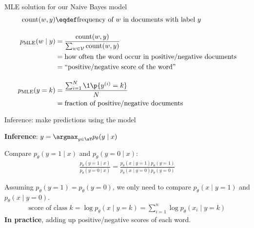 \documentclass[usenames,dvipsnames,notes,11pt,aspectratio=169]{beamer}
\newcommand{\pdfnote}[1]{}
\begin{document}

\begin{frame}
    {MLE solution for our Naive Bayes model}
    \begin{align*}
        \text{count}(w, y) &\eqdef \text{frequency of $w$ in documents with label $y$}\\[1em]
        p_{\text{MLE}}(w\mid y) &= \frac{\text{count}(w, y)}{\sum_{w\in\mathcal{V}}\text{count}(w, y)}\\
        &= \text{how often the word occur in positive/negative documents}\\
        &= \text{``positive/negative score of the word''}\\[1em]
        p_{\text{MLE}}(y=k) &= \frac{\sum_{i=1}^N \1\p{y^{(i)}=k}}{N}\\
        &= \text{fraction of positive/negative documents}
    \end{align*}

\end{frame}

\begin{frame}
    {Inference: make predictions using the model}

    \textbf{Inference}: $y=\argmax_{y\in\sY} p_\theta(y\mid x)$ 

    \medskip
    \pause
    Compare $p_\theta(y=1\mid x)$ and $p_\theta(y=0\mid x)$:
    \begin{align*}
        \frac{p_\theta(y=1\mid x)}{p_\theta(y=0\mid x)} = 
        \frac{p_\theta(x\mid y=1)p_\theta(y=1)}{p_\theta(x\mid y=0)p_\theta(y=0)}
    \end{align*}

    \pause
    Assuming $p_\theta(y=1)=p_\theta(y=0)$, we only need to compare $p_\theta(x\mid y=1)$ and $p_\theta(x\mid y=0)$.
    \begin{align*}
        \text{score of class $k$} = \log p_\theta(x \mid y=k) = \sum_{i=1}^n \log p_\theta(x_i \mid y=k) 
    \end{align*}
    {\bf In practice}, adding up positive/negative scores of each word.
\end{frame}
\end{document}
